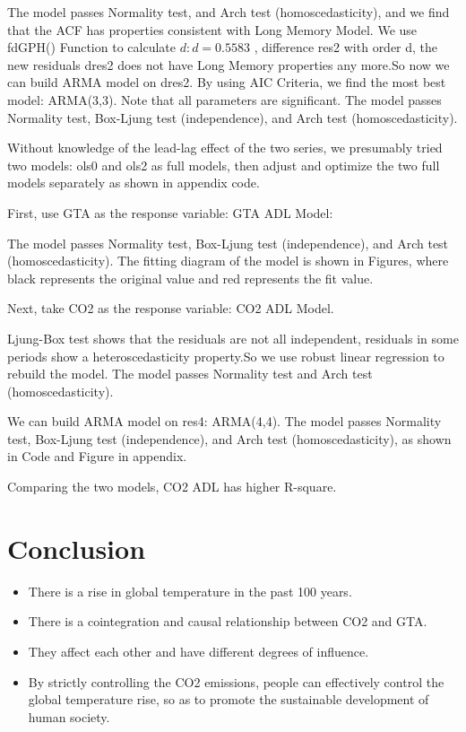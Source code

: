 \documentclass[a4paper,11pt]{article}
\begin{document}
The model passes Normality test, and Arch test (homoscedasticity), and we find that the ACF has properties consistent with Long Memory Model. We use fdGPH() Function to calculate $d: d=0.5583$ , difference res2 with order d, the new residuals dres2 does not have Long Memory properties any more.So now we can build ARMA model on dres2. By using AIC Criteria, we find the most best model: ARMA(3,3). Note that all parameters are significant. The model passes Normality test, Box-Ljung test (independence), and Arch test (homoscedasticity).\par
Without knowledge of the lead-lag effect of the two series, we presumably tried two models: ols0 and ols2 as full models, then adjust and optimize the two full models separately as shown in appendix code.\par
First, use GTA as the response variable: GTA ADL Model:\par
The model passes Normality test, Box-Ljung test (independence), and Arch test (homoscedasticity). The fitting diagram of the model is shown in Figures, where black represents the original value and red represents the fit value.\par
Next, take CO2 as the response variable: CO2 ADL Model.\par
Ljung-Box test shows that the residuals are not all independent, residuals in some periods show a heteroscedasticity property.So we use robust linear regression to rebuild the model. The model passes Normality test and Arch test (homoscedasticity).\par
We can build ARMA model on res4: ARMA(4,4). The model passes Normality test, Box-Ljung test (independence), and Arch test (homoscedasticity), as shown in Code and Figure in appendix.\par
Comparing the two models, CO2 ADL has higher R-square.

\section{Conclusion}
\begin{itemize}
\item There is a rise in global temperature in the past 100 years.
\item There is a cointegration and causal relationship between CO2 and GTA.
\item They affect each other and have different degrees of influence.
\item By strictly controlling the CO2 emissions, people can effectively control the global temperature rise, so as to promote the sustainable development of human society.
\end{itemize}
\end{document}
